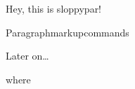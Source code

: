 \documentclass[draft]{book}
\begin{document}
\begin{sloppypar}
Hey, this is sloppypar!
\end{sloppypar}

Paragraph\linebreak[3]markup\linebreak{}commands

Later on\ldots\\



where\addtocounter{equation}{1}\setcounter{equation}{50}

\cleardoublepage
{}
{}
\printindex
\end{document}
